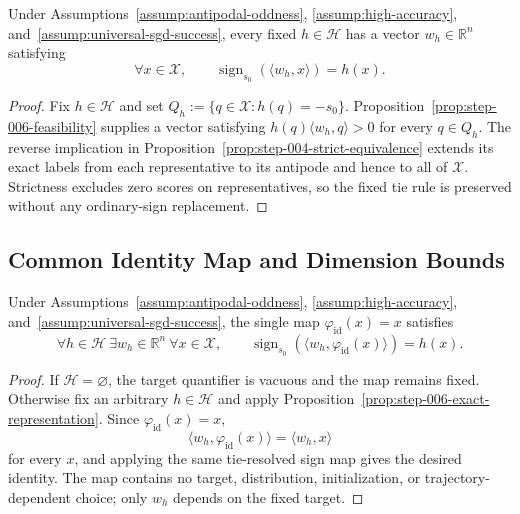 \begin{proposition}
\label{prop:step-006-exact-representation}
Under Assumptions~\ref{assump:antipodal-oddness},
\ref{assump:high-accuracy}, and~\ref{assump:universal-sgd-success}, every
fixed $h\in\mathcal H$ has a vector $w_h\in\mathbb R^n$ satisfying
\[
\forall x\in\mathcal X,\qquad
\operatorname{sign}_{s_0}(\langle w_h,x\rangle)=h(x).
\]
\end{proposition}

\begin{proof}
Fix $h\in\mathcal H$ and set
$Q_h:=\{q\in\mathcal X:h(q)=-s_0\}$.  Proposition~\ref{prop:step-006-feasibility}
supplies a vector satisfying
$h(q)\langle w_h,q\rangle>0$ for every $q\in Q_h$.  The reverse implication in
Proposition~\ref{prop:step-004-strict-equivalence} extends its exact labels
from each representative to its antipode and hence to all of $\mathcal X$.
Strictness excludes zero scores on representatives, so the fixed tie rule is
preserved without any ordinary-sign replacement.
\end{proof}

\subsection{Common Identity Map and Dimension Bounds}
\label{app:dimension-closure}

\begin{proposition}
\label{prop:step-007-common-identity}
Under Assumptions~\ref{assump:antipodal-oddness},
\ref{assump:high-accuracy}, and~\ref{assump:universal-sgd-success}, the
single map $\varphi_{\mathrm{id}}(x)=x$ satisfies
\[
\forall h\in\mathcal H\ \exists w_h\in\mathbb R^n\ \forall x\in\mathcal X,
\qquad
\operatorname{sign}_{s_0}(\langle w_h,\varphi_{\mathrm{id}}(x)\rangle)=h(x).
\]
\end{proposition}

\begin{proof}
If $\mathcal H=\varnothing$, the target quantifier is vacuous and the map
remains fixed.  Otherwise fix an arbitrary $h\in\mathcal H$ and apply
Proposition~\ref{prop:step-006-exact-representation}.  Since
$\varphi_{\mathrm{id}}(x)=x$,
\[
\langle w_h,\varphi_{\mathrm{id}}(x)\rangle=\langle w_h,x\rangle
\]
for every $x$, and applying the same tie-resolved sign map gives the desired
identity.  The map contains no target, distribution, initialization, or
trajectory-dependent choice; only $w_h$ depends on the fixed target.
\end{proof}


